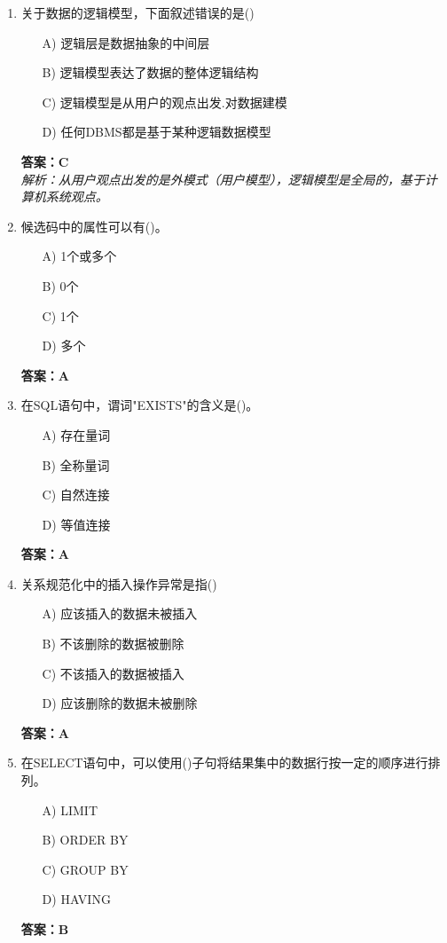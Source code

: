 \documentclass[a4paper,12pt]{article}
\begin{document}
\begin{enumerate}[label=\arabic*.]
\item 关于数据的逻辑模型，下面叙述错误的是()
\begin{itemize}
    \item[A)] 逻辑层是数据抽象的中间层
    \item[B)] 逻辑模型表达了数据的整体逻辑结构
    \item[C)] 逻辑模型是从用户的观点出发.对数据建模
    \item[D)] 任何DBMS都是基于某种逻辑数据模型
\end{itemize}
\textbf{答案：C} \\
\textit{解析：从用户观点出发的是外模式（用户模型），逻辑模型是全局的，基于计算机系统观点。}

\item 候选码中的属性可以有()。
\begin{itemize}
    \item[A)] 1个或多个
    \item[B)] 0个
    \item[C)] 1个
    \item[D)] 多个
\end{itemize}
\textbf{答案：A}

\item 在SQL语句中，谓词"EXISTS"的含义是()。
\begin{itemize}
    \item[A)] 存在量词
    \item[B)] 全称量词
    \item[C)] 自然连接
    \item[D)] 等值连接
\end{itemize}
\textbf{答案：A}

\item 关系规范化中的插入操作异常是指()
\begin{itemize}
    \item[A)] 应该插入的数据未被插入
    \item[B)] 不该删除的数据被删除
    \item[C)] 不该插入的数据被插入
    \item[D)] 应该删除的数据未被删除
\end{itemize}
\textbf{答案：A}

\item 在SELECT语句中，可以使用()子句将结果集中的数据行按一定的顺序进行排列。
\begin{itemize}
    \item[A)] LIMIT
    \item[B)] ORDER BY
    \item[C)] GROUP BY
    \item[D)] HAVING
\end{itemize}
\textbf{答案：B}


\end{enumerate}
\end{document}
